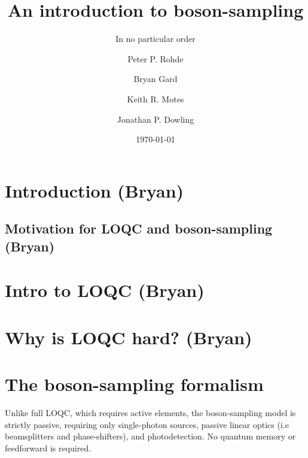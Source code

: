 \documentclass[aps,pra,twocolumn,amsmath,amssymb,nofootinbib,superscriptaddress]{revtex4}
\begin{document}


%
%

\title{An introduction to boson-sampling}

%
%

\author{In no particular order}

\author{Peter P. Rohde}

\author{Bryan Gard}

\author{Keith R. Motes}

\author{Jonathan P. Dowling}

\date{\today}

\frenchspacing

%
%

\begin{abstract}
\end{abstract}

\maketitle

\section{Introduction (Bryan)}

\subsection{Motivation for LOQC and boson-sampling (Bryan)}

\section{Intro to LOQC (Bryan)}

\section{Why is LOQC hard? (Bryan)}

\section{The boson-sampling formalism}

Unlike full LOQC, which requires active elements, the boson-sampling model is strictly passive, requiring only single-photon sources, passive linear optics (i.e beamsplitters and phase-shifters), and photodetection. No quantum memory or feedforward is required.
\end{document}

